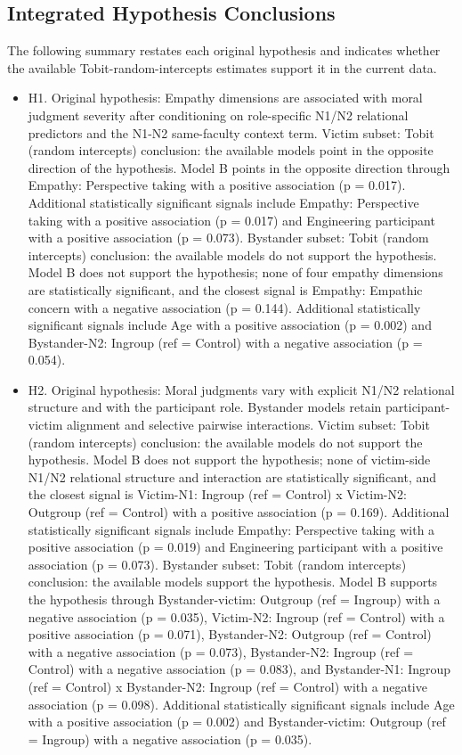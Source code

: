 \documentclass[11pt]{article}
\begin{document}
\subsection{Integrated Hypothesis Conclusions}
The following summary restates each original hypothesis and indicates whether the available Tobit-random-intercepts estimates support it in the current data.
\begin{itemize}
\item H1. Original hypothesis: Empathy dimensions are associated with moral judgment severity after conditioning on role-specific N1/N2 relational predictors and the N1-N2 same-faculty context term. Victim subset: Tobit (random intercepts) conclusion: the available models point in the opposite direction of the hypothesis. Model B points in the opposite direction through Empathy: Perspective taking with a positive association (p = 0.017). Additional statistically significant signals include Empathy: Perspective taking with a positive association (p = 0.017) and Engineering participant with a positive association (p = 0.073). Bystander subset: Tobit (random intercepts) conclusion: the available models do not support the hypothesis. Model B does not support the hypothesis; none of four empathy dimensions are statistically significant, and the closest signal is Empathy: Empathic concern with a negative association (p = 0.144). Additional statistically significant signals include Age with a positive association (p = 0.002) and Bystander-N2: Ingroup (ref = Control) with a negative association (p = 0.054).
\item H2. Original hypothesis: Moral judgments vary with explicit N1/N2 relational structure and with the participant role. Bystander models retain participant-victim alignment and selective pairwise interactions. Victim subset: Tobit (random intercepts) conclusion: the available models do not support the hypothesis. Model B does not support the hypothesis; none of victim-side N1/N2 relational structure and interaction are statistically significant, and the closest signal is Victim-N1: Ingroup (ref = Control) x Victim-N2: Outgroup (ref = Control) with a positive association (p = 0.169). Additional statistically significant signals include Empathy: Perspective taking with a positive association (p = 0.019) and Engineering participant with a positive association (p = 0.073). Bystander subset: Tobit (random intercepts) conclusion: the available models support the hypothesis. Model B supports the hypothesis through Bystander-victim: Outgroup (ref = Ingroup) with a negative association (p = 0.035), Victim-N2: Ingroup (ref = Control) with a positive association (p = 0.071), Bystander-N2: Outgroup (ref = Control) with a negative association (p = 0.073), Bystander-N2: Ingroup (ref = Control) with a negative association (p = 0.083), and Bystander-N1: Ingroup (ref = Control) x Bystander-N2: Ingroup (ref = Control) with a negative association (p = 0.098). Additional statistically significant signals include Age with a positive association (p = 0.002) and Bystander-victim: Outgroup (ref = Ingroup) with a negative association (p = 0.035).

\end{itemize}
\end{document}
